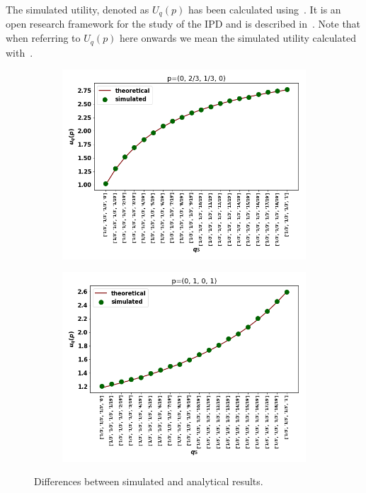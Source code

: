 \documentclass[10pt]{article}
\begin{document}
The simulated utility, denoted
as \(U_q(p)\) has been calculated using~\cite{axelrodproject}. It is an open research
framework for the study of the IPD and is described in~\cite{Knight2016}. Note that
when referring to \(U_q(p)\) here onwards we mean the simulated utility calculated
with~\cite{axelrodproject}.

\begin{figure}[!htbp]
\begin{center}
    \begin{subfigure}{0.45\textwidth}
        \includegraphics[width=\linewidth]{img/validation_img_two.png}
    \end{subfigure}
    \begin{subfigure}{0.45\textwidth}
        \includegraphics[width=\linewidth]{img/validation_img_three.png}
    \end{subfigure}
\end{center}
\caption{Differences between simulated and analytical results.}
\label{fig:analytical_simulated}
\end{figure}
\end{document}
